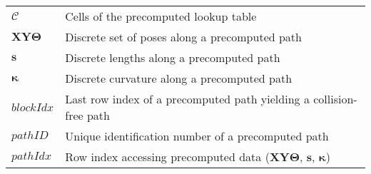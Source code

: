 \documentclass[oneside,english,master=wtk,inputenc="utf8"]{kulemt}
\begin{document}
\begin{flushleft}
\begin{tabularx}{\textwidth}{@{}p{16mm}X@{}}
$\mathcal{C}$ 		& Cells of the precomputed lookup table\\
$\bm{XY\Theta}$ 	& Discrete set of poses along a precomputed path \\
$\bm{s}$ 				& Discrete lengths along a precomputed path  \\
$\bm{\kappa}$ 		& Discrete curvature along a precomputed path   \\
$blockIdx$ 				& Last row index of a precomputed path yielding a collision-free path   \\
$pathID$  				& Unique identification number of a precomputed path \\
$pathIdx$ 				&	Row index accessing precomputed data ($\bm{XY\Theta}$, $\bm{s}$, $\bm{\kappa}$)
\end{tabularx}
\end{flushleft}

\mainmatter






\appendixpage*
\appendix



\backmatter


\end{document}
